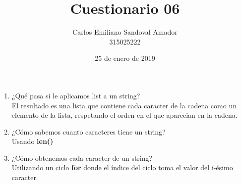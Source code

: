 \documentclass[letterpaper, 12pt, oneside]{article}%
\title{Cuestionario 06}
\author{Carlos Emiliano Sandoval Amador \\ 315025222}
\date{25 de enero de 2019}
\begin{document}
	\maketitle
	\begin{enumerate}
		\item ¿Qué pasa si le aplicamos list a un string? \\ El resultado es una lista que contiene cada caracter de la cadena como un elemento de la lista, respetando el orden en el que aparecian en la cadena.
		\item ¿Cómo sabemos cuanto caracteres tiene un string? \\ Usando \textbf{len()}
		\item ¿Cómo obtenemos cada caracter de un string? \\ Utilizando un ciclo \textbf{for} donde el índice del ciclo toma el valor del i-ésimo caracter.
	\end{enumerate}
\end{document}
